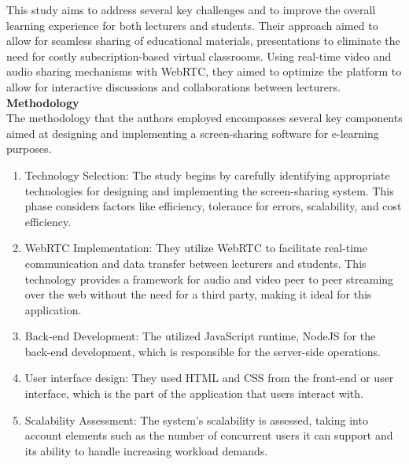 \documentclass[a4paper,12pt]{article}  %
\begin{document}
This study aims to address several key challenges and to improve the overall
learning experience for both lecturers and students. Their approach aimed to
allow for seamless sharing of educational materials, presentations to eliminate
the need for costly subscription-based virtual classrooms. Using real-time
video and audio sharing mechanisms with WebRTC, they aimed to optimize the
platform to allow for interactive discussions and collaborations between
lecturers.\cite{emmanuel2022design}\\

\textbf{Methodology}\\
The methodology that the authors employed encompasses several key components aimed at designing and implementing a screen-sharing software for e-learning purposes.\\

\begin{enumerate}
      \item Technology Selection: The study begins by carefully identifying appropriate
            technologies for designing and implementing the screen-sharing system. This
            phase considers factors like efficiency, tolerance for errors, scalability, and
            cost efficiency.\\
      \item WebRTC Implementation: They utilize WebRTC to facilitate real-time
            communication and data transfer between lecturers and students. This technology
            provides a framework for audio and video peer to peer streaming over the web
            without the need for a third party, making it ideal for this application.\\
      \item Back-end Development: The utilized JavaScript runtime, NodeJS for the back-end
            development, which is responsible for the server-side operations.\\
      \item User interface design: They used HTML and CSS from the front-end or user
            interface, which is the part of the application that users interact with.\\
      \item Scalability Assessment: The system's scalability is assessed, taking into
            account elements such as the number of concurrent users it can support and its
            ability to handle increasing workload demands.\\
\end{enumerate}
\end{document}
